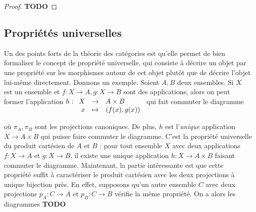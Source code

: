 \documentclass{article}
\newcommand{\todo}{\textbf{TODO}}
\newcommand{\applic}[4]{\begin{array}[t]{rcl}
#1 & \to & #2 \\
#3 & \mapsto & #4
\end{array}}
\theoremstyle{plain}
\theoremstyle{definition}
\theoremstyle{remark}
\begin{document}
\begin{proof}
    \todo
\end{proof}

\subsection{Propriétés universelles}

Un des points forts de la théorie des catégories est qu'elle permet de bien formaliser le concept de propriété universelle, qui consiste à décrire un objet par une propriété sur les morphismes autour de cet objet plutôt que de décrire l'objet lui-même directement. Donnons un exemple. Soient $A,B$ deux ensembles. Si $X$ est un ensemble et $f : X \to A,g : X \to B$ sont des applications, alors on peut former l'application $h : \applic{X}{A\times B}{x}{(f(x),g(x))}$ qui fait commuter le diagramme
\begin{center}
\end{center}
où $\pi_A,\pi_B$ sont les projections canoniques. De plus, $h$ est l'\emph{unique} application $X \to A\times B$ qui puisse faire commuter le diagramme. C'est la propriété universelle du produit cartésien de $A$ et $B$ : pour tout ensemble $X$ avec deux applications $f : X \to A$ et $g : X \to B$, il existe une unique application $h : X \to A\times B$ faisant commuter le diagramme. Maintenant, la partie intéressante est que cette propriété suffit à caractériser le produit cartésien avec les deux projections à unique bijection près. En effet, supposons qu'un autre ensemble $C$ avec deux projections $p_A : C \to A$ et $p_B : C \to B$ vérifie la même propriété. On a alors les diagrammes \todo
\end{document}
